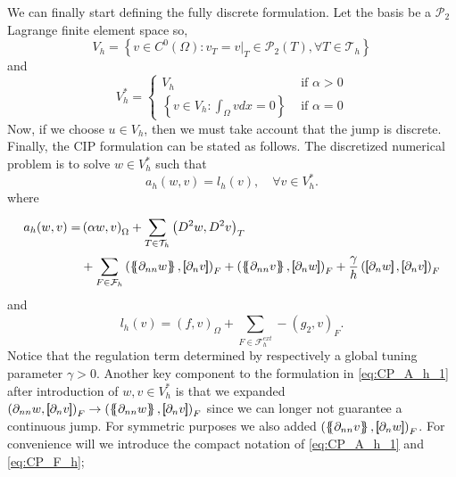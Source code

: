 We can finally start defining the fully discrete formulation. Let the basis be a $\mathcal{P}_{2} $ Lagrange finite element space so,
\[
V_{h} = \left\{ v \in C^{0}\left( \Omega  \right): v_{T} = v | _{T} \in \mathcal{P} _{2}\left( T \right), \forall T \in
\mathcal{T}_{h}    \right\}
\]
and
\[
V_{h}^{*} = \begin{cases}
    V_{h} & \text{ if } \alpha  > 0 \\
    \left\{ v \in V_{h}: \int_{\Omega }^{} v dx   = 0   \right\} &  \text{ if } \alpha   = 0
\end{cases}
\]
Now, if we choose $u \in V_{h}$, then we must take account that the jump is discrete.
 Finally, the CIP formulation can be stated as follows.
The discretized numerical problem is to solve $w \in V_{h}^{*}$ such that
\begin{equation}
\label{eq:CP_A_F}
a_{h}( w, v )   = l_{h}( v), \quad \forall v \in V_{h}^{*}  .
\end{equation}
where
\begin{equation}
\label{eq:CP_A_h_1}
\begin{split}
a_{h} ( w, v )   =&
    \left( \alpha  w, v \right) _{\Omega } + \sum_{T \in \mathcal{T} _{h}}^{} \left( D^2 w, D^2v \right) _{T} \\
 & + \sum_{F \in \mathcal{F}_{h} }^{}
  \left( \mean{  \partial _{n n} w }, \jump{ \partial _{n }v} \right)_{F}  +
 \left( \mean{ \partial _{n n} v }, \jump{ \partial _{n}w }      \right)_{F}   + \frac{\gamma}{h}  \left( \jump{ \partial _{n} w}, \jump{ \partial _{n} v   }   \right)_{F}
\end{split}
\end{equation}
and
\begin{equation}
\label{eq:CP_F_h}
l_{h}( v )  = \left( f, v \right) _{\Omega } +  \sum_ {F \in \mathcal{F}_{h} ^{ext}}^{} - \left(g_{2}, v  \right) _{F}.
\end{equation}
Notice that the regulation term determined by respectively a global tuning parameter $\gamma >0 $. Another key component to the formulation
in \eqref{eq:CP_A_h_1} after introduction of $ w, v \in V^{*}_{h}$  is that we expanded $\left( \partial _{nn}w, \jump{ \partial _{n} v }  \right)_{F} \to \left( \mean{ \partial _{nn}w }  , \jump{ \partial _{n} v }  \right)_{F} $ since we can longer not guarantee a
continuous jump. For symmetric purposes we also added $ \left( \mean{ \partial _{nn} v}  , \jump{ \partial _{n} w }  \right)_{F} $. For convenience will we introduce the compact notation of \eqref{eq:CP_A_h_1} and \eqref{eq:CP_F_h};

